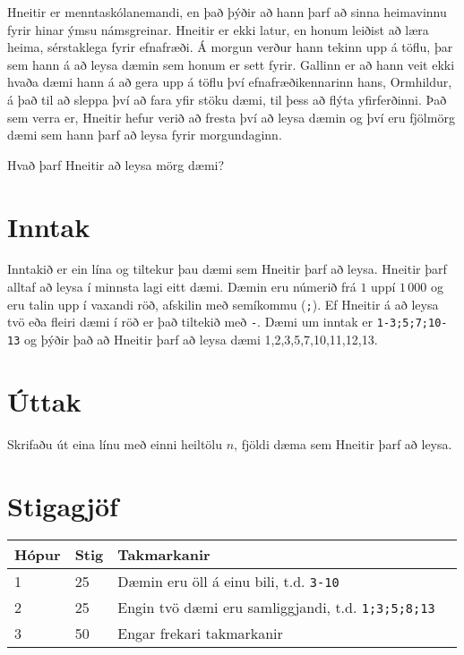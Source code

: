 
\noindent
Hneitir er menntaskólanemandi, en það þýðir að hann þarf að sinna 
heimavinnu fyrir hinar ýmsu námsgreinar. Hneitir er ekki latur,
en honum leiðist að læra heima, sérstaklega fyrir efnafræði. 
Á morgun verður hann tekinn upp á töflu, þar sem hann á að leysa 
dæmin sem honum er sett fyrir.
Gallinn er að hann veit ekki hvaða dæmi hann á að gera upp á töflu 
því efnafræðikennarinn hans, Ormhildur, á það til að sleppa því að
fara yfir stöku dæmi, til þess að flýta yfirferðinni. 
Það sem verra er, Hneitir hefur verið að fresta því að leysa dæmin
og því eru fjölmörg dæmi sem hann þarf að leysa fyrir morgundaginn.

Hvað þarf Hneitir að leysa mörg dæmi?

\section*{Inntak}
Inntakið er ein lína og tiltekur þau dæmi sem Hneitir þarf að leysa. Hneitir þarf alltaf að leysa í minnsta lagi eitt dæmi.
Dæmin eru númerið frá $1$ uppí $1\,000$ og eru talin upp í vaxandi röð, afskilin með semíkommu (\texttt{;}).
Ef Hneitir á að leysa tvö eða fleiri dæmi í röð er það tiltekið með \texttt{-}.
Dæmi um inntak er \texttt{1-3;5;7;10-13} og þýðir það að Hneitir þarf að leysa dæmi 1,2,3,5,7,10,11,12,13.

\section*{Úttak}
Skrifaðu út eina línu með einni heiltölu $n$, fjöldi dæma sem Hneitir þarf að leysa.

\section*{Stigagjöf}
\begin{tabular}{|l|l|l|l|}
\hline
Hópur & Stig & Takmarkanir \\ \hline
1     & 25  & Dæmin eru öll á einu bili, t.d. \texttt{3-10} \\ \hline
2     & 25  & Engin tvö dæmi eru samliggjandi, t.d. \texttt{1;3;5;8;13} \\ \hline
3     & 50  & Engar frekari takmarkanir \\ \hline
\end{tabular}
